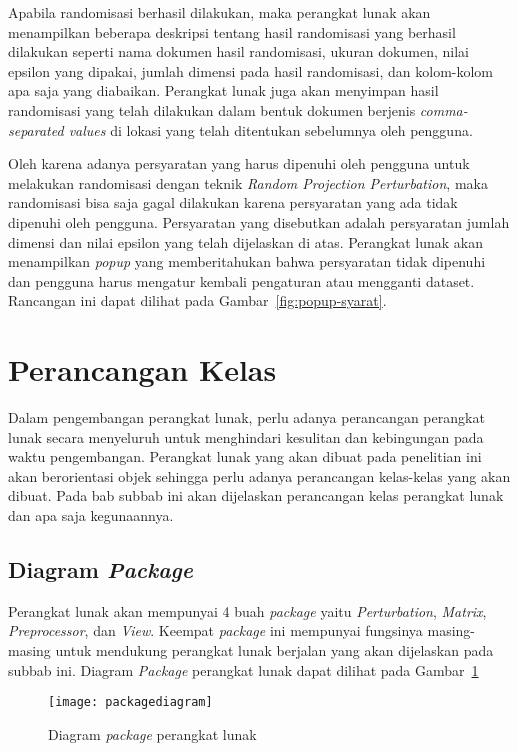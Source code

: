 Apabila randomisasi berhasil dilakukan, maka perangkat lunak akan menampilkan beberapa deskripsi tentang hasil randomisasi yang berhasil dilakukan seperti nama dokumen hasil randomisasi, ukuran dokumen, nilai epsilon yang dipakai, jumlah dimensi pada hasil randomisasi, dan kolom-kolom apa saja yang diabaikan. Perangkat lunak juga akan menyimpan hasil randomisasi yang telah dilakukan dalam bentuk dokumen berjenis \textit{comma-separated values} di lokasi yang telah ditentukan sebelumnya oleh pengguna.

Oleh karena adanya persyaratan yang harus dipenuhi oleh pengguna untuk melakukan randomisasi dengan teknik \textit{Random Projection Perturbation}, maka randomisasi bisa saja gagal dilakukan karena persyaratan yang ada tidak dipenuhi oleh pengguna. Persyaratan yang disebutkan adalah persyaratan jumlah dimensi dan nilai epsilon yang telah dijelaskan di atas. Perangkat lunak akan menampilkan \textit{popup} yang memberitahukan bahwa persyaratan tidak dipenuhi dan pengguna harus mengatur kembali pengaturan atau mengganti dataset. Rancangan ini dapat dilihat pada Gambar~\ref{fig:popup-syarat}.

\section{Perancangan Kelas}
\label{sec:kelas}

Dalam pengembangan perangkat lunak, perlu adanya perancangan perangkat lunak secara menyeluruh untuk menghindari kesulitan dan kebingungan pada waktu pengembangan. Perangkat lunak yang akan dibuat pada penelitian ini akan berorientasi objek sehingga perlu adanya perancangan kelas-kelas yang akan dibuat. Pada bab subbab ini akan dijelaskan perancangan kelas perangkat lunak dan apa saja kegunaannya.

\subsection{Diagram \textit{Package}}
\label{sec:diagram-package}

Perangkat lunak akan mempunyai 4 buah \textit{package} yaitu \textit{Perturbation}, \textit{Matrix}, \textit{Preprocessor}, dan \textit{View}. Keempat \textit{package} ini mempunyai fungsinya masing-masing untuk mendukung perangkat lunak berjalan yang akan dijelaskan pada subbab ini. Diagram \textit{Package} perangkat lunak dapat dilihat pada Gambar~\ref{fig:packagediagram}

\begin{figure}
	\centering
	\texttt{[image: packagediagram]}
	\caption{Diagram \textit{package} perangkat lunak}
	\label{fig:packagediagram}
\end{figure}

